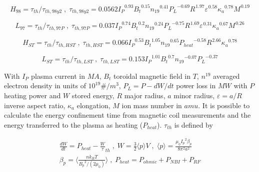 \begin{equation}
{ H }_{ 98 }={\tau }_{ th }/{\tau }_{ th,98y2 } \; , \; {\tau }_{ th,98y2 }=0.0562 {{ I }_{ P }}^{ 0.93} {{ B }_{ t }}^{ 0.15} {{ n }_{ 19 }}^{ 0.41} {{ P }_{ L }}^{ -0.69} {{ R }_{  }}^{ 1.97} {{ \varepsilon  }_{  }}^{ 0.58} {{ \kappa  }_{ a }}^{ 0.78} {{ M }_{  }}^{ 0.19}
\label{eq:h98y2}
\end{equation}

\begin{equation}
{ L }_{ 97 }={\tau }_{ th }/{\tau }_{ th,97P } \; , \; {\tau }_{ th,97P }=0.037 {{ I }_{ P }}^{ 0.74} {{ B }_{ t }}^{ 0.2} {{ n }_{ 19 }}^{ 0.24} {{ P }_{ L }}^{ -0.75} {{ R }_{  }}^{ 1.69} {{ \varepsilon  }_{  }}^{ 0.31} {{ \kappa  }_{ a }}^{ 0.67} {{ M }_{  }}^{ 0.26}
\label{eq:l97}
\end{equation}


\begin{equation}
{ H }_{ ST }={\tau }_{ th }/{\tau }_{ th,HST } \; , \; {\tau }_{ th,HST }=0.066 {{ I }_{ P }}^{ 0.53} {{ B }_{ t }}^{ 1.05} {{ n }_{ 19 }}^{ 0.65} {{ P }_{ heat }}^{ -0.58} {{ R }_{  }}^{ 2.66} {{ \kappa  }_{ a }}^{ 0.78}
\label{eq:HST}
\end{equation}

\begin{equation}
{ L }_{ ST }={\tau }_{ th }/{\tau }_{ th,LST } \; , \; {\tau }_{ th,LST }=0.153 {{ I }_{ P }}^{ 1.01} {{ B }_{ t }}^{ 0.7} {{ n }_{ 19 }}^{ -0.07} {{ P }_{ L }}^{ -0.37}
\label{eq:LST}
\end{equation}

With $I_P$ plasma current in $MA$, $B_t$ toroidal magnetic field in $T$, $n^{19}$ averaged electron density in units of $10^{19} \#/m^3$, $P_L=P-dW/dt$ power loss in $MW$ with $P$ heating power and $W$ stored energy, $R$ major radius, $a$ minor radius, $\varepsilon=a/R$ inverse aspect ratio, $\kappa _a$ elongation, $M$ ion mass number in $amu$.
It is possible to calculate the energy confinement time from magnetic coil measurements and the energy transferred to the plasma as heating ($P_{heat}$). $\tau_{th}$ is defined by 

\begin{equation}
\begin{split}
\frac {dW} {dt}={P}_{heat} - \frac {W} {\tau }_{ th } \; , \; W=\frac { 3} {2} \langle p \rangle V \; , \; \langle p \rangle = \frac {{ \mu }_{ 0 } {{ I }_{ p }}^{ 2 } { \beta }_{ p }} { 8 {\pi}^{2} {a}^{2}  } \\ {\beta }_{ p } = \langle \frac { n {k}_{B} T} { {{B}_{p}}^{2} /(2 {\mu}_{0}) } \rangle \; , \; {P }_{ heat }={ P }_{ ohmic }+{ P }_{ NBI }+{ P }_{ RF }
\label{eq:tau}
\end{split}
\end{equation}


